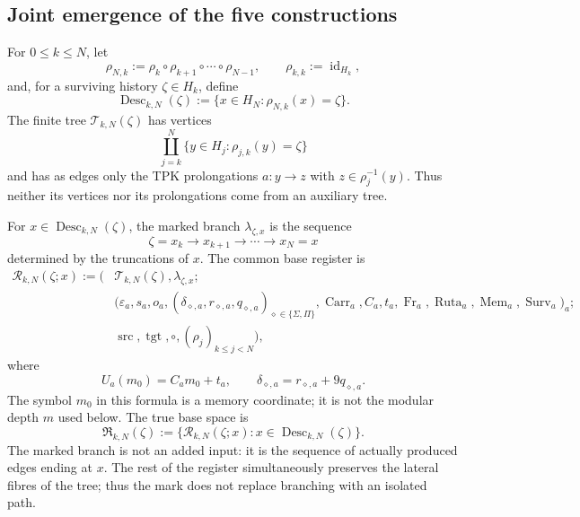 \subsection{Joint emergence of the five constructions}
\label{ix:sec:cinco-construcciones-continuo-ch}

For \(0\leq k\leq N\), let
\[
 \rho_{N,k}:=\rho_k\circ\rho_{k+1}\circ\cdots\circ\rho_{N-1},
 \qquad \rho_{k,k}:=\operatorname{id}_{H_k},
\]
and, for a surviving history \(\zeta\in H_k\), define
\[
 \operatorname{Desc}_{k,N}(\zeta)
 :=\{x\in H_N:\rho_{N,k}(x)=\zeta\}.
\]
The finite tree \(\mathscr T_{k,N}(\zeta)\) has vertices
\[
 \coprod_{j=k}^{N}\{y\in H_j:\rho_{j,k}(y)=\zeta\}
\]
and has as edges only the TPK prolongations
\(a:y\to z\) with \(z\in\rho_j^{-1}(y)\). Thus neither its vertices nor
its prolongations come from an auxiliary tree.

For \(x\in\operatorname{Desc}_{k,N}(\zeta)\), the marked branch
\(\lambda_{\zeta,x}\) is the sequence
\[
 \zeta=x_k\longrightarrow x_{k+1}\longrightarrow\cdots
 \longrightarrow x_N=x
\]
determined by the truncations of \(x\). The common base register is
\[
\begin{aligned}
 \mathscr R_{k,N}(\zeta;x):=
 \bigl(&\mathscr T_{k,N}(\zeta),\lambda_{\zeta,x};\\
 &\bigl(\varepsilon_a,s_a,o_a,
   (\delta_{\diamond,a},r_{\diamond,a},q_{\diamond,a})
       _{\diamond\in\{\Sigma,\Pi\}},
   \operatorname{Carr}_a,C_a,t_a,\operatorname{Fr}_a,
   \operatorname{Ruta}_a,\operatorname{Mem}_a,
   \operatorname{Surv}_a\bigr)_a;\\
 &\operatorname{src},\operatorname{tgt},\circ,
   (\rho_j)_{k\leq j<N}\bigr),
\end{aligned}
\tag{C1}
\label{ix:eq:base-comun-registros}
\]
where
\[
 U_a(m_0)=C_am_0+t_a,
 \qquad
 \delta_{\diamond,a}=r_{\diamond,a}+9q_{\diamond,a}.
\]
The symbol \(m_0\) in this formula is a memory coordinate; it is not the
modular depth \(m\) used below. The true base space is
\[
 \mathfrak R_{k,N}(\zeta)
 :=\{\mathscr R_{k,N}(\zeta;x):
       x\in\operatorname{Desc}_{k,N}(\zeta)\}.
\]
The marked branch is not an added input: it is the sequence of actually
produced edges ending at \(x\). The rest of the register simultaneously
preserves the lateral fibres of the tree; thus the mark does not replace
branching with an isolated path.

